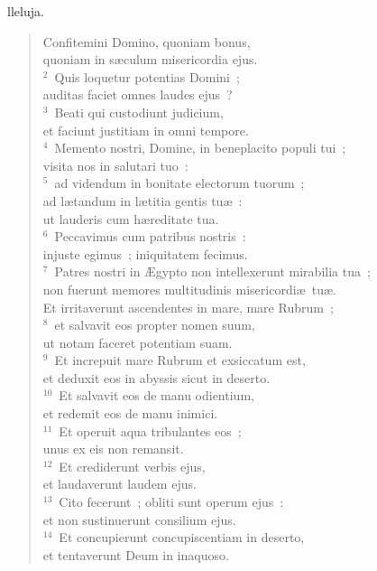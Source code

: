 \bchapter[Psalm]
lleluja. \begin{verse}Confitemini Domino, quoniam bonus,\\ quoniam in s\ae culum misericordia ejus.\\
${}^{2}$~Quis loquetur potentias Domini~;\\ auditas faciet omnes laudes ejus~?\\
${}^{3}$~Beati qui custodiunt judicium,\\ et faciunt justitiam in omni tempore.\\
${}^{4}$~Memento nostri, Domine, in beneplacito populi tui~;\\ visita nos in salutari tuo~:\\
${}^{5}$~ad videndum in bonitate electorum tuorum~;\\ ad l\ae tandum in l\ae titia gentis tu\ae~:\\ ut lauderis cum h\ae reditate tua.\\
${}^{6}$~Peccavimus cum patribus nostris~:\\ injuste egimus~; iniquitatem fecimus.\\
${}^{7}$~Patres nostri in \AE gypto non intellexerunt mirabilia tua~;\\ non fuerunt memores multitudinis misericordi\ae\ tu\ae .\\ Et irritaverunt ascendentes in mare, mare Rubrum~;\\
${}^{8}$~et salvavit eos propter nomen suum,\\ ut notam faceret potentiam suam.\\
${}^{9}$~Et increpuit mare Rubrum et exsiccatum est,\\ et deduxit eos in abyssis sicut in deserto.\\
${}^{10}$~Et salvavit eos de manu odientium,\\ et redemit eos de manu inimici.\\
${}^{11}$~Et operuit aqua tribulantes eos~;\\ unus ex eis non remansit.\\
${}^{12}$~Et crediderunt verbis ejus,\\ et laudaverunt laudem ejus.\\
${}^{13}$~Cito fecerunt~; obliti sunt operum ejus~:\\ et non sustinuerunt consilium ejus.\\
${}^{14}$~Et concupierunt concupiscentiam in deserto,\\ et tentaverunt Deum in inaquoso.\\

\end{verse}
